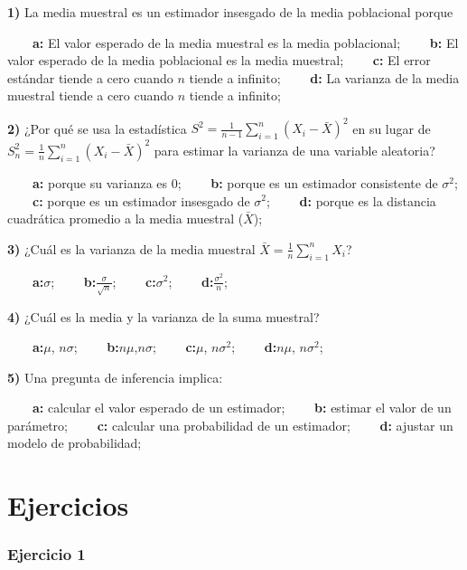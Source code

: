\documentclass[
]{book}
\begin{document}
\textbf{1)} La media muestral es un estimador insesgado de la media poblacional porque

\textbf{\(\qquad\)a:} El valor esperado de la media muestral es la media poblacional;
\textbf{\(\qquad\)b:} El valor esperado de la media poblacional es la media muestral;
\textbf{\(\qquad\)c:} El error estándar tiende a cero cuando \(n\) tiende a infinito;
\textbf{\(\qquad\)d:} La varianza de la media muestral tiende a cero cuando \(n\) tiende a infinito;

\textbf{2)} ¿Por qué se usa la estadística \(S^2=\frac{1}{n-1}\sum_{i=1}^{n}(X_i -\bar{X})^2\) en su lugar de \(S_n^2=\frac{1}{n}\sum_{i=1}^{n}(X_i -\bar{X})^2\) para estimar la varianza de una variable aleatoria?

\textbf{\(\qquad\)a:} porque su varianza es \(0\);
\textbf{\(\qquad\)b:} porque es un estimador consistente de \(\sigma^2\);
\textbf{\(\qquad\)c:} porque es un estimador insesgado de \(\sigma^2\);
\textbf{\(\qquad\)d:} porque es la distancia cuadrática promedio a la media muestral (\(\bar{X}\));

\textbf{3)} ¿Cuál es la varianza de la media muestral \(\bar{X}=\frac{1}{n}\sum_{i=1}^n X_i\)?

\textbf{\(\qquad\)a:}\(\sigma\);
\textbf{\(\qquad\)b:}\(\frac{\sigma}{\sqrt{n}}\);
\textbf{\(\qquad\)c:}\(\sigma^2\);
\textbf{\(\qquad\)d:}\(\frac{\sigma^2}{n}\);

\textbf{4)} ¿Cuál es la media y la varianza de la suma muestral?

\textbf{\(\qquad\)a:}\(\mu\), \(n\sigma\);
\textbf{\(\qquad\)b:}\(n\mu\),\(n\sigma\);
\textbf{\(\qquad\)c:}\(\mu\), \(n\sigma^2\);
\textbf{\(\qquad\)d:}\(n\mu\), \(n\sigma^2\);

\textbf{5)} Una pregunta de inferencia implica:

\textbf{\(\qquad\)a:} calcular el valor esperado de un estimador;
\textbf{\(\qquad\)b:} estimar el valor de un parámetro;
\textbf{\(\qquad\)c:} calcular una probabilidad de un estimador;
\textbf{\(\qquad\)d:} ajustar un modelo de probabilidad;

\hypertarget{ejercicios-8}{%
\section{Ejercicios}\label{ejercicios-8}}

\hypertarget{ejercicio-1-7}{%
\subsubsection{Ejercicio 1}\label{ejercicio-1-7}}
\end{document}
